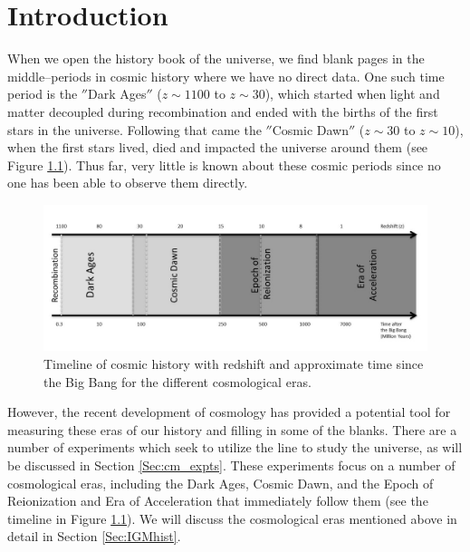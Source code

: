 \chapter{Introduction}\label{Ch:Intro}

When we open the history book of the universe, we find blank pages in the middle--periods in cosmic history where we have no direct data. One such time period is the $''$Dark Ages$''$ ($z \sim 1100$ to $z \sim 30$), which started when light and matter decoupled during recombination and ended with the births of the first stars in the universe. Following that came the $''$Cosmic Dawn$''$ ($z\sim 30$ to $z\sim 10$), when the first stars lived, died and impacted the universe around them (see Figure \ref{Fig:hist}). Thus far, very little is known about these cosmic periods since no one has been able to observe them directly. 

\begin{figure}[htb]
\begin{center}
\includegraphics[width=0.95\linewidth]{Introduction/figures/timeline.jpg}
\caption{Timeline of cosmic history with redshift and approximate time since the Big Bang for the different cosmological eras. }
\label{Fig:hist}
\end{center}
\end{figure}

However, the recent development of \cm cosmology has provided a potential tool for measuring these eras of our history and filling in some of the blanks. There are a number of experiments which seek to utilize the \cm line to study the universe, as will be discussed in Section \ref{Sec:cm_expts}. These experiments focus on a number of cosmological eras, including the Dark Ages, Cosmic Dawn, and the Epoch of Reionization and Era of Acceleration that immediately follow them (see the timeline in Figure \ref{Fig:hist}). We will discuss the cosmological eras mentioned above in detail in Section \ref{Sec:IGMhist}.


